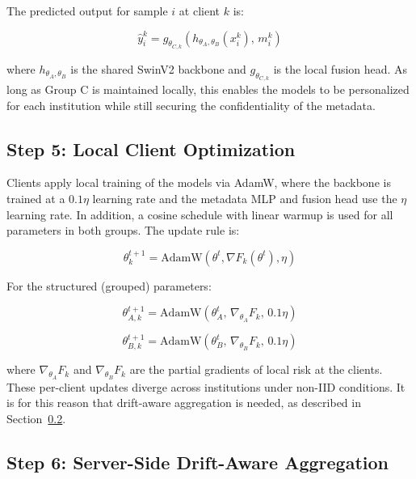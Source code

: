 \documentclass{ieeeaccess}
\begin{document}
The predicted output for sample $i$ at client $k$ is:

\begin{equation}
\label{eq:prediction}
\hat{y}_i^k = g_{\theta_{C,k}}\!\left(h_{\theta_A,\theta_B}(x_i^k),\, m_i^k\right)
\end{equation}

where $h_{\theta_A,\theta_B}$ is the shared SwinV2 backbone and $g_{\theta_{C,k}}$ is the local fusion head. As long as Group C is maintained locally, this enables the models to be personalized for each institution while still securing the confidentiality of the metadata.

\subsection{Step 5: Local Client Optimization}

Clients apply local training of the models via AdamW, where the backbone is trained at a $0.1\eta$ learning rate and the metadata MLP and fusion head use the $\eta$ learning rate. In addition, a cosine schedule with linear warmup is used for all parameters in both groups. The update rule is:

\begin{equation}
\label{eq:local_update}
\theta_k^{t+1} = \text{AdamW}(\theta^t, \nabla F_k(\theta^t), \eta)
\end{equation}

For the structured (grouped) parameters:

\begin{equation}
\label{eq:groupA_update}
\theta_{A,k}^{t+1} = \text{AdamW}\!\left(\theta_A^t,\, \nabla_{\theta_A} F_k,\, 0.1\eta\right)
\end{equation}

\begin{equation}
\label{eq:groupB_update}
\theta_{B,k}^{t+1} = \text{AdamW}\!\left(\theta_B^t,\, \nabla_{\theta_B} F_k,\, 0.1\eta\right)
\end{equation}

where $\nabla_{\theta_A} F_k$ and $\nabla_{\theta_B} F_k$ are the partial gradients of local risk at the clients. These per-client updates diverge across institutions under non-IID conditions. It is for this reason that drift-aware aggregation is needed, as described in Section~\ref{sec:drift_agg}.

\subsection{Step 6: Server-Side Drift-Aware Aggregation}
\label{sec:drift_agg}
\end{document}
